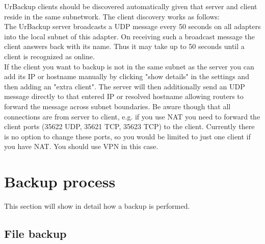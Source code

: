 \documentclass[a4paper,10pt]{article}
\begin{document}
UrBackup clients should be discovered automatically given that server and client reside in the same subnetwork. The client discovery works as follows:\\
The UrBackup server broadcasts a UDP message every 50 seconds on all adapters into the local subnet of this adapter. On receiving such a broadcast message the client answers back with its name. Thus it may take up to 50 seconds until a client is recognized as online.\\
If the client you want to backup is not in the same subnet as the server you can add its IP or hostname manually by clicking "show details" in the settings and then adding an "extra client". The server will then additionally send an UDP message directly to that entered IP or resolved hostname allowing routers to forward the message across subnet boundaries. Be aware though that all connections are from server to client, e.g. if you use NAT you need to forward the client ports (35622 UDP, 35621 TCP, 35623 TCP) to the client. Currently there is no option to change these ports, so you would be limited to just one client if you have NAT. You should use VPN in this case.

\section{Backup process}
\label{sec_backup_process}

This section will show in detail how a backup is performed.

\subsection{File backup}
\end{document}
